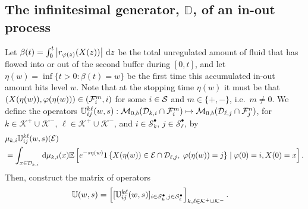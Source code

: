 \subsection{The infinitesimal generator, \(\mathbb D\), of an in-out process}\label{subsec: afjakje}
Let $\beta(t) = \int_0^t \left| r_{\varphi(z)}(X(z)) \right|  \, \mathrm{d} z$ be the total unregulated amount of fluid that has flowed into or out of the second buffer during $[0,t]$, and let $\eta(w) = \inf \{t > 0: \beta(t) = w\}$ be the first time this accumulated in-out amount hits level $w$. Note that at the stopping time \(\eta(w)\) it must be that \((X({\eta(w)}),\varphi({\eta(w)}))\in(\mathcal{F}_i^m,i)\) for some \(i\in\mathcal{S}\) and \(m\in\{+,-\}\), i.e.~\(m\neq0\). We define the operators $\mathbb{U}_{ij}^{k\ell}(w,s): \mathcal{M}_{0,b}(\mathcal{D}_{k,i}\cap\mathcal{F}_i^m) \mapsto \mathcal{M}_{0,b} (\mathcal{D}_{\ell,j}\cap\mathcal{F}_j^n)$, for $k\in\mathcal K^+\cup\mathcal K^-$,  $\ell\in\mathcal K^+\cup\mathcal K^-$, and $i \in \mathcal{S}_k^\bullet,\,j \in \mathcal{S}_\ell^\bullet$, by 
% 
	\begin{align*} 
		&\mu_{k,i}\mathbb{U}_{ij}^{k\ell} (w,s) (\mathcal{E}) 
		\\&= \int_{x \in \mathcal{D}_{k,i}} \, \mathrm{d}  \mu_{k,i}(x) \mathbb{E}\left[e^{-s\eta(w)}{1}\left\{X({\eta(w)}) \in \mathcal{E}\cap\mathcal{D}_{\ell,j},\;\varphi({\eta(w)}) = j\right\} \mid \varphi(0) = i, X(0) = x\right].
	\end{align*} 
Then, construct the matrix of operators 
\begin{align*}
\mathbb U(w,s) &= \left[[\mathbb U_{ij}^{k\ell}(w,s)]_{i\in\mathcal{S}_k^\bullet,j\in\mathcal{S}_\ell^\bullet}\right]_{k,\ell\in\mathcal K^+\cup\mathcal K^-}.\end{align*}
